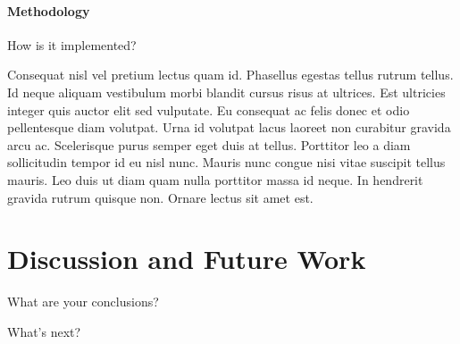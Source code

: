 \subsubsection*{Methodology}

How is it implemented?

\vskip 1cm

Consequat nisl vel pretium lectus quam id. Phasellus egestas tellus rutrum tellus. Id neque aliquam vestibulum morbi blandit cursus risus at ultrices. Est ultricies integer quis auctor elit sed vulputate. Eu consequat ac felis donec et odio pellentesque diam volutpat. Urna id volutpat lacus laoreet non curabitur gravida arcu ac. Scelerisque purus semper eget duis at tellus. Porttitor leo a diam sollicitudin tempor id eu nisl nunc. Mauris nunc congue nisi vitae suscipit tellus mauris. Leo duis ut diam quam nulla porttitor massa id neque. In hendrerit gravida rutrum quisque non. Ornare lectus sit amet est.




\chapter{Discussion and Future Work}
\label{chap:discussion-future-work}

What are your conclusions?

What's next?
